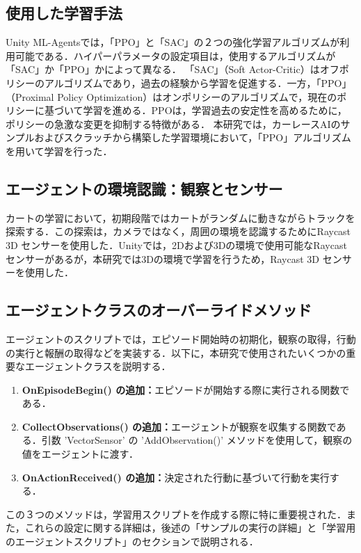 \subsection{使用した学習手法}
Unity ML-Agentsでは，「PPO」と「SAC」の２つの強化学習アルゴリズムが利用可能である．ハイパーパラメータの設定項目は，使用するアルゴリズムが「SAC」か「PPO」かによって異なる．
「SAC」（Soft Actor-Critic）はオフポリシーのアルゴリズムであり，過去の経験から学習を促進する．一方，「PPO」（Proximal Policy Optimization）はオンポリシーのアルゴリズムで，現在のポリシーに基づいて学習を進める．PPOは，学習過去の安定性を高めるために，ポリシーの急激な変更を抑制する特徴がある．
本研究では，カーレースAIのサンプルおよびスクラッチから構築した学習環境において，「PPO」アルゴリズムを用いて学習を行った．

\subsection{エージェントの環境認識：観察とセンサー}
カートの学習において，初期段階ではカートがランダムに動きながらトラックを探索する．この探索は，カメラではなく，周囲の環境を認識するためにRaycast 3D センサーを使用した．Unityでは，2Dおよび3Dの環境で使用可能なRaycastセンサーがあるが，本研究では3Dの環境で学習を行うため，Raycast 3D センサーを使用した．

\subsection{エージェントクラスのオーバーライドメソッド}
エージェントのスクリプトでは，エピソード開始時の初期化，観察の取得，行動の実行と報酬の取得などを実装する．以下に，本研究で使用されたいくつかの重要なエージェントクラスを説明する．
\begin{enumerate}
  \item \textbf{OnEpisodeBegin() の追加：}エピソードが開始する際に実行される関数である．
  \item \textbf{CollectObservations() の追加：}エージェントが観察を収集する関数である．引数 'VectorSensor' の 'AddObservation()' メソッドを使用して，観察の値をエージェントに渡す．
  \item \textbf{OnActionReceived() の追加：}決定された行動に基づいて行動を実行する．
\end{enumerate}

この３つのメソッドは，学習用スクリプトを作成する際に特に重要視された．また，これらの設定に関する詳細は，後述の「サンプルの実行の詳細」と「学習用のエージェントスクリプト」のセクションで説明される．

